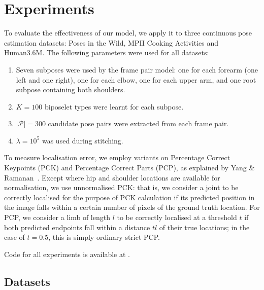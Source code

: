 \documentclass[runningheads]{llncs}
\begin{document}
\section{Experiments}\label{sec:experiments}


To evaluate the effectiveness of our model, we apply it to three continuous pose
estimation datasets: Poses in the Wild, MPII Cooking Activities and Human3.6M.
The following parameters were used for all datasets:

\begin{enumerate}
\item Seven subposes were used by the frame pair model: one for each forearm
(one left and one right), one for each elbow, one for each upper arm, and one
root subpose containing both shoulders.
\item $K = 100$ biposelet types were learnt for each subpose.
\item $|\mathcal P| = 300$ candidate pose pairs were extracted from each frame
pair.
\item $\lambda = 10^5$ was used during stitching.
\end{enumerate}

To measure localisation error, we employ variants on Percentage Correct
Keypoints (PCK) and Percentage Correct Parts (PCP), as explained by Yang \&
Ramanan~\cite{yang2013articulated}. Except where hip and shoulder locations are
available for normalisation, we use unnormalised PCK: that is, we consider a
joint to be correctly localised for the purpose of PCK calculation if its
predicted position in the image falls within a certain number of pixels of the
ground truth location. For PCP, we consider a limb of length $l$ to be correctly
localised at a threshold $t$ if both predicted endpoints fall within a distance
$tl$ of their true locations; in the case of $t = 0.5$, this is simply ordinary
strict PCP.

Code for all experiments is available at .

\subsection{Datasets}
\end{document}
